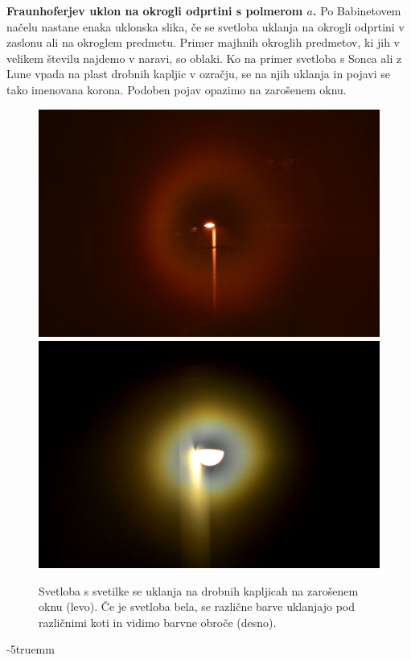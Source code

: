 \begin{example}{\bf Fraunhoferjev uklon na okrogli odprtini s polmerom $a$.}
Po Babinetovem načelu nastane enaka uklonska slika, če se svetloba uklanja
na okrogli odprtini v zaslonu ali na okroglem predmetu. Primer majhnih okroglih
predmetov, ki jih v velikem številu najdemo v naravi, so oblaki. Ko na primer svetloba
s Sonca ali z Lune vpada na plast drobnih kapljic v ozračju, se na njih uklanja in pojavi se
tako imenovana korona. Podoben pojav opazimo na zarošenem oknu. 
\begin{figure}[ht]
\centering
\includegraphics[width=70truemm]{slike/05_photos_svetilka.jpg}\hfill
\includegraphics[width=70truemm]{slike/05_photos_luc.jpg}
\caption{Svetloba s svetilke se uklanja na drobnih kapljicah na zarošenem oknu (levo). Če je svetloba
bela, se različne barve uklanjajo pod različnimi koti in vidimo barvne obroče (desno).}
\label{fig:05_uklon_svetilka}
\end{figure}
\vglue-5truemm

\end{example}

